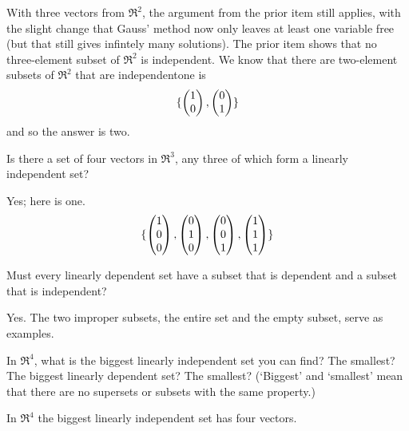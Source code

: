 \begin{exercises}
\begin{answer}
\begin{exparts}
        With three vectors from $\Re^2$, the argument from the prior item 
        still applies, with the slight change that Gauss' method now only 
        leaves at least one variable free (but that still gives infintely many
        solutions).
      \partsitem The prior item shows that no three-element subset of $\Re^2$
        is independent.
        We know that there are two-element subsets of $\Re^2$ that are 
        independent\Dash one is
        \begin{equation*}
          \mbox{$\{\begin{pmatrix} 1  \\ 0 \end{pmatrix},\begin{pmatrix} 0  \\ 1 \end{pmatrix}\}$}
        \end{equation*} 
        and so the answer is two.
     \end{exparts}  
    \end{answer}
  \recommended \item
    Is there a set of four vectors in \( \Re^3 \), any three of which
    form a linearly independent set?
    \begin{answer}
      Yes; here is one.
      \begin{equation*}
         \mbox{$\{\begin{pmatrix} 1 \\ 0 \\ 0 \end{pmatrix},
              \begin{pmatrix} 0 \\ 1 \\ 0 \end{pmatrix},
              \begin{pmatrix} 0 \\ 0 \\ 1 \end{pmatrix},
              \begin{pmatrix} 1 \\ 1 \\ 1 \end{pmatrix} \}$}
      \end{equation*}  
    \end{answer}
  \item  
    Must every linearly dependent set have a subset that is dependent and
    a subset that is independent?
    \begin{answer}
      Yes.
      The two improper subsets, the entire set and the empty subset, serve as
      examples.  
    \end{answer}
  \item  
    In \( \Re^4 \), what is the biggest linearly independent
    set you can find?
    The smallest?
    The biggest linearly dependent set?
    The smallest?
    (`Biggest' and `smallest' mean that there are no supersets or subsets 
    with the same property.)
    \begin{answer} 
      In \( \Re^4 \) the biggest linearly independent set has
      four vectors.

\end{answer}
\end{exercises}
